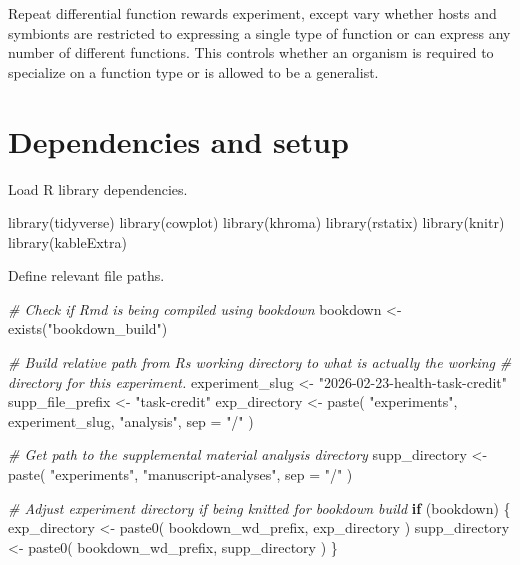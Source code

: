 \documentclass[
]{book}
\newenvironment{Shaded}{\begin{snugshade}}{\end{snugshade}}
\newcommand{\AttributeTok}[1]{\textcolor[rgb]{0.77,0.63,0.00}{#1}}
\newcommand{\CommentTok}[1]{\textcolor[rgb]{0.56,0.35,0.01}{\textit{#1}}}
\newcommand{\ControlFlowTok}[1]{\textcolor[rgb]{0.13,0.29,0.53}{\textbf{#1}}}
\newcommand{\FunctionTok}[1]{\textcolor[rgb]{0.00,0.00,0.00}{#1}}
\newcommand{\NormalTok}[1]{#1}
\newcommand{\OtherTok}[1]{\textcolor[rgb]{0.56,0.35,0.01}{#1}}
\newcommand{\StringTok}[1]{\textcolor[rgb]{0.31,0.60,0.02}{#1}}
\begin{document}
Repeat differential function rewards experiment,
except vary whether hosts and symbionts are restricted to expressing a single type of function or can express any number of different functions.
This controls whether an organism is required to specialize on a function type or is allowed to be a generalist.

\hypertarget{dependencies-and-setup-5}{%
\section{Dependencies and setup}\label{dependencies-and-setup-5}}

Load R library dependencies.

\begin{Shaded}
\begin{Highlighting}[]
\FunctionTok{library}\NormalTok{(tidyverse)}
\FunctionTok{library}\NormalTok{(cowplot)}
\FunctionTok{library}\NormalTok{(khroma)}
\FunctionTok{library}\NormalTok{(rstatix)}
\FunctionTok{library}\NormalTok{(knitr)}
\FunctionTok{library}\NormalTok{(kableExtra)}
\end{Highlighting}
\end{Shaded}

Define relevant file paths.

\begin{Shaded}
\begin{Highlighting}[]
\CommentTok{\# Check if Rmd is being compiled using bookdown}
\NormalTok{bookdown }\OtherTok{\textless{}{-}} \FunctionTok{exists}\NormalTok{(}\StringTok{"bookdown\_build"}\NormalTok{)}

\CommentTok{\# Build relative path from R\textquotesingle{}s working directory to what is actually the working}
\CommentTok{\# directory for this experiment.}
\NormalTok{experiment\_slug }\OtherTok{\textless{}{-}} \StringTok{"2026{-}02{-}23{-}health{-}task{-}credit"}
\NormalTok{supp\_file\_prefix }\OtherTok{\textless{}{-}} \StringTok{"task{-}credit"}
\NormalTok{exp\_directory }\OtherTok{\textless{}{-}} \FunctionTok{paste}\NormalTok{(}
  \StringTok{"experiments"}\NormalTok{,}
\NormalTok{  experiment\_slug,}
  \StringTok{"analysis"}\NormalTok{,}
  \AttributeTok{sep =} \StringTok{"/"}
\NormalTok{)}

\CommentTok{\# Get path to the supplemental material analysis directory}
\NormalTok{supp\_directory }\OtherTok{\textless{}{-}} \FunctionTok{paste}\NormalTok{(}
  \StringTok{"experiments"}\NormalTok{,}
  \StringTok{"manuscript{-}analyses"}\NormalTok{,}
  \AttributeTok{sep =} \StringTok{"/"}
\NormalTok{)}

\CommentTok{\# Adjust experiment directory if being knitted for bookdown build}
\ControlFlowTok{if}\NormalTok{ (bookdown) \{}
\NormalTok{  exp\_directory }\OtherTok{\textless{}{-}} \FunctionTok{paste0}\NormalTok{(}
\NormalTok{    bookdown\_wd\_prefix,}
\NormalTok{    exp\_directory}
\NormalTok{  )}
\NormalTok{  supp\_directory }\OtherTok{\textless{}{-}} \FunctionTok{paste0}\NormalTok{(}
\NormalTok{    bookdown\_wd\_prefix,}
\NormalTok{    supp\_directory}
\NormalTok{  )}
\NormalTok{\}}
\end{Highlighting}
\end{Shaded}
\end{document}
